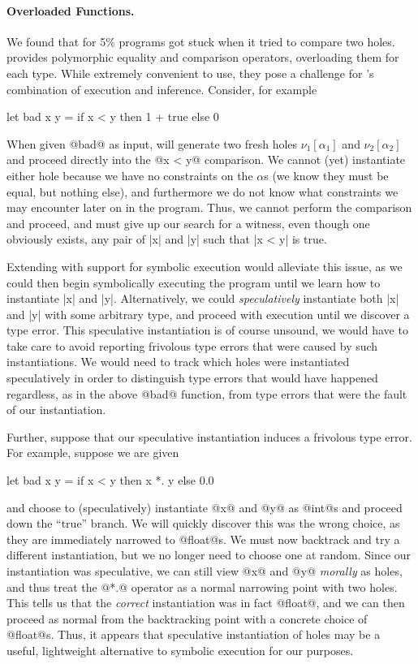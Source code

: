 \paragraph{Overloaded Functions.}
%
We found that for 5\% programs \toolname got stuck when it tried to
compare two holes.
%
\ocaml provides polymorphic equality and comparison operators,
overloading them for each type.
%
While extremely convenient to use, they pose a challenge for \toolname's
combination of execution and inference.
%
Consider, for example
%
\begin{code}
  let bad x y =
    if x < y then
      1 + true
    else
      0
\end{code}
%
When given @bad@ as input, \toolname will generate two fresh holes
$\nu_1[\alpha_1]$ and $\nu_2[\alpha_2]$ and proceed directly into the
@x < y@ comparison.
%
We cannot (yet) instantiate either hole because we have no constraints
on the $\alpha$s (we know they must be equal, but nothing else), and
furthermore we do not know what constraints we may encounter later on in
the program.
%
Thus, we cannot perform the comparison and proceed, and must give up our
search for a witness, even though one obviously exists, any pair of |x|
and |y| such that |x < y| is true.

Extending \toolname with support for symbolic execution would alleviate
this issue, as we could then begin symbolically executing the program
until we learn how to instantiate |x| and |y|.
%
Alternatively, we could \emph{speculatively} instantiate both |x| and
|y| with some arbitrary type, and proceed with execution until we
discover a type error.
%
This speculative instantiation is of course unsound, we would have to
take care to avoid reporting frivolous type errors that were caused by
such instantiations.
%
We would need to track which holes were instantiated speculatively in
order to distinguish type errors that would have happened regardless, as
in the above @bad@ function, from type errors that were the fault of our
instantiation.

Further, suppose that our speculative instantiation induces a frivolous
type error.
%
For example, suppose we are given
%
\begin{code}
  let bad x y =
    if x < y then
      x *. y
    else
      0.0
\end{code}
%
and choose to (speculatively) instantiate @x@ and @y@ as @int@s and proceed
down the ``true'' branch.
%
We will quickly discover this was the wrong choice, as they are immediately
narrowed to @float@s.
%
We must now backtrack and try a different instantiation, but we no
longer need to choose one at random.
%
Since our instantiation was speculative, we can still view @x@ and @y@
\emph{morally} as holes, and thus treat the @*.@ operator as a normal
narrowing point with two holes.
%
This tells us that the \emph{correct} instantiation was in fact @float@,
and we can then proceed as normal from the backtracking point with a
concrete choice of @float@s.
%
Thus, it appears that speculative instantiation of holes may be a
useful, lightweight alternative to symbolic execution for our purposes.


